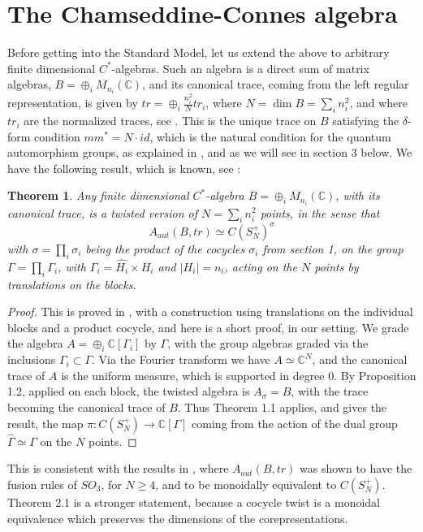 \documentclass[11pt]{amsart}
\newtheorem{theorem}{Theorem}[section]
\theoremstyle{definition}
\begin{document}
\section{The Chamseddine-Connes algebra}

Before getting into the Standard Model, let us extend the above to arbitrary finite dimensional $C^*$-algebras. Such an algebra is a direct sum of matrix algebras, $B=\oplus_iM_{n_i}(\mathbb C)$, and its canonical trace, coming from the left regular representation, is given by $tr=\oplus_i\frac{n_i^2}{N}tr_i$, where $N=\dim B=\sum_in_i^2$, and where $tr_i$ are the normalized traces, see \cite{ban}. This is the unique trace on $B$ satisfying the $\delta$-form condition $mm^*=N\cdot id$, which is the natural condition for the quantum automorphism groups, as explained in \cite{ban}, and as we will see in section 3 below. We have the following result, which is known, see \cite{behy}:

\begin{theorem}
Any finite dimensional $C^*$-algebra $B=\oplus_iM_{n_i}(\mathbb C)$, with its canonical trace, is a twisted version of $N=\sum_in_i^2$ points, in the sense that
$$A_{aut}(B,tr)\simeq C(S_N^+)^\sigma$$
with $\sigma=\prod_i\sigma_i$ being the product of the cocycles $\sigma_i$ from section 1, on the group $\Gamma=\prod_i\Gamma_i$, with $\Gamma_i=\widehat{H_i}\times H_i$ and $|H_i|=n_i$, acting on the $N$ points by translations on the blocks.
\end{theorem}

\begin{proof}
This is proved in \cite[Theorem 3.1]{behy}, with a construction using translations on the individual blocks and a product cocycle, and here is a short proof, in our setting. We grade the algebra $A=\oplus_i\mathbb C[\Gamma_i]$ by $\Gamma$, with the group algebras graded via the inclusions $\Gamma_i\subset\Gamma$. Via the Fourier transform we have $A\simeq\mathbb C^N$, and the canonical trace of $A$ is the uniform measure, which is supported in degree $0$. By Proposition 1.2, applied on each block, the twisted algebra is $A_\sigma=B$, with the trace becoming the canonical trace of $B$. Thus Theorem 1.1 applies, and gives the result, the map $\pi:C(S_N^+)\to\mathbb C[\Gamma]$ coming from the action of the dual group $\widehat{\Gamma}\simeq\Gamma$ on the $N$ points.
\end{proof}

This is consistent with the results in \cite{ban,dvv}, where $A_{aut}(B,tr)$ was shown to have the fusion rules of $SO_3$, for $N\geq4$, and to be monoidally equivalent to $C(S_N^+)$. Theorem 2.1 is a stronger statement, because a cocycle twist is a monoidal equivalence which preserves the dimensions of the corepresentations.
\end{document}

